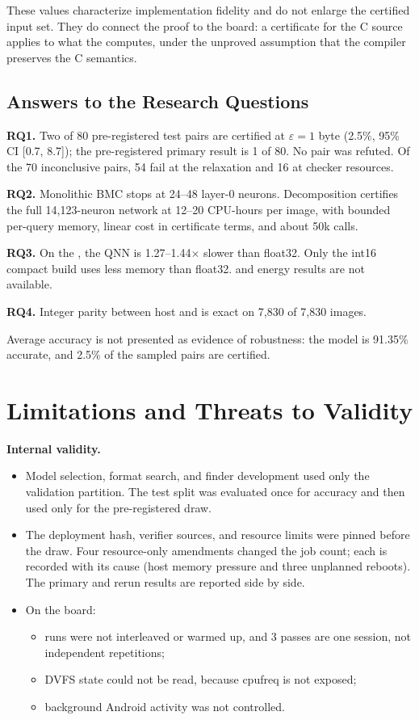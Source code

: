 These values characterize implementation fidelity and do not enlarge the certified input set. They do connect the proof to the board: a certificate for the C source applies to what the \Aseven{} computes, under the unproved assumption that the compiler preserves the C semantics.

\subsection{Answers to the Research Questions}
\textbf{RQ1.} Two of 80 pre-registered test pairs are certified at $\varepsilon = 1$ byte (2.5\%, 95\% CI [0.7, 8.7]); the pre-registered primary result is 1 of 80. No pair was refuted. Of the 70 inconclusive pairs, 54 fail at the relaxation and 16 at checker resources.

\textbf{RQ2.} Monolithic BMC stops at 24--48 layer-0 neurons. Decomposition certifies the full 14,123-neuron network at 12--20 CPU-hours per image, with bounded per-query memory, linear cost in certificate terms, and about 50k calls.

\textbf{RQ3.} On the \Aseven{}, the QNN is 1.27--1.44$\times$ slower than float32. Only the int16 compact build uses less memory than float32. \Athree{} and energy results are not available.

\textbf{RQ4.} Integer parity between host and \Aseven{} is exact on 7,830 of 7,830 images.

Average accuracy is not presented as evidence of robustness: the model is 91.35\% accurate, and 2.5\% of the sampled pairs are certified.

\section{Limitations and Threats to Validity}
\label{sec:limitations}

\textbf{Internal validity.}
\begin{itemize}
  \item Model selection, format search, and finder development used only the validation partition. The test split was evaluated once for accuracy and then used only for the pre-registered draw.
  \item The deployment hash, verifier sources, and resource limits were pinned before the draw. Four resource-only amendments changed the job count; each is recorded with its cause (host memory pressure and three unplanned reboots). The primary and rerun results are reported side by side.
  \item On the board:
    \begin{itemize}
      \item runs were not interleaved or warmed up, and 3 passes are one session, not independent repetitions;
      \item DVFS state could not be read, because cpufreq is not exposed;
      \item background Android activity was not controlled.
    \end{itemize}
\end{itemize}

